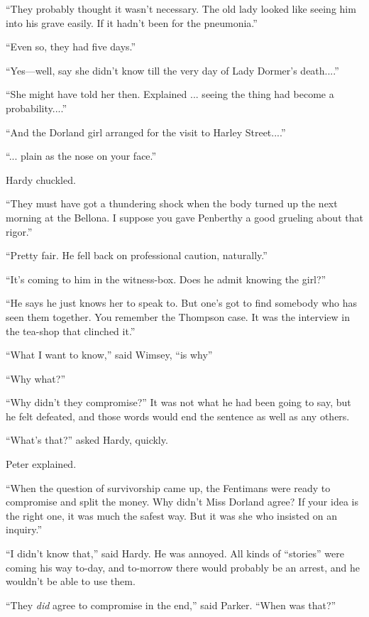 \enquote{They probably thought it wasn't necessary. The old lady looked like seeing him into his grave easily. If it hadn't been for the pneumonia.}

\enquote{Even so, they had five days.}

\enquote{Yes\allowbreak---\allowbreak well, say she didn't know till the very day of Lady Dormer's death....}

\enquote{She might have told her then. Explained ... seeing the thing had become a probability....}

\enquote{And the Dorland girl arranged for the visit to Harley Street....}

\enquote{... plain as the nose on your face.}

Hardy chuckled.

\enquote{They must have got a thundering shock when the body turned up the next morning at the Bellona. I suppose you gave Penberthy a good grueling about that rigor.}

\enquote{Pretty fair. He fell back on professional caution, naturally.}

\enquote{It's coming to him in the witness-box. Does he admit knowing the girl?}

\enquote{He says he just knows her to speak to. But one's got to find somebody who has seen them together. You remember the Thompson case. It was the interview in the tea-shop that clinched it.}

\enquote{What I want to know,} said Wimsey, \enquote{is why\longdash}

\enquote{Why what?}

\enquote{Why didn't they compromise?} It was not what he had been going to say, but he felt defeated, and those words would end the sentence as well as any others.

\enquote{What's that?} asked Hardy, quickly.

Peter explained.

\enquote{When the question of survivorship came up, the Fentimans were ready to compromise and split the money. Why didn't Miss Dorland agree? If your idea is the right one, it was much the safest way. But it was she who insisted on an inquiry.}

\enquote{I didn't know that,} said Hardy. He was annoyed. All kinds of \enquote{stories} were coming his way to-day, and to-morrow there would probably be an arrest, and he wouldn't be able to use them.

\enquote{They \textit{did} agree to compromise in the end,} said Parker. \enquote{When was that?}

